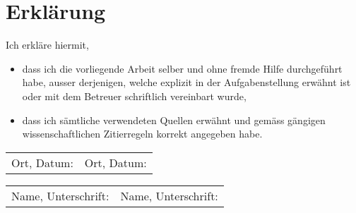 \chapter*{Erklärung}

Ich erkläre hiermit,
\begin{itemize}
\item dass ich die vorliegende Arbeit selber und ohne fremde Hilfe durchgeführt habe, ausser derjenigen, welche explizit in der Aufgabenstellung erwähnt ist oder mit dem Betreuer schriftlich vereinbart wurde,
\item dass ich sämtliche verwendeten Quellen erwähnt und gemäss gängigen wissenschaftlichen Zitierregeln korrekt angegeben habe.
\end{itemize}

\vspace{3cm}

\begin{tabular}{p{7cm}p{7cm}}
Ort, Datum: & Ort, Datum: \\ 
\end{tabular} 

\vspace{1cm}

\begin{tabular}{p{7cm}p{7cm}}
Name, Unterschrift: & Name, Unterschrift: \\ 
\end{tabular} 